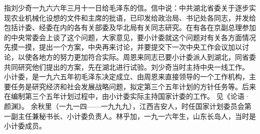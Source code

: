 \begin{maonote}
指刘少奇一九六六年三月十一日给毛泽东的信。信中说：中共湖北省委关于逐步实现农业机械化设想的文件和主席的批语，已印发给政治局、书记处各同志，并发给包括计委、经委在内的各有关部委及华北局有关同志研究。在有各在京副总理参加的中央常委会上谈了这个问题，大家意见，要小计委就这个问题对有关各方面情况先摸一摸，提出一个方案，中央再来讨论，并要提交下一次中央工作会议加以讨论，以使各地方的努力更加符合实际。周恩来同志已要小计委派人到湖北，同省委共同研究他们提出的方案，先在湖北进行试验。刘少奇当时主持中央一线工作。
小计委，是一九六五年初毛泽东决定成立、由周恩来直接领导的一个工作机构，主要任务是研究经济和社会发展战略问题，拟定第三个五年计划的方针任务等。后来在编制第三个五年计划过程中，由小计委实际主持国家计委的工作。
见《论语·颜渊》。
余秋里（一九一四——一九九九），江西吉安人，时任国家计划委员会第一副主任兼秘书长、小计委负责人。林乎加，一九一六年生，山东长岛人，当时是小计委成员。
\end{maonote}
